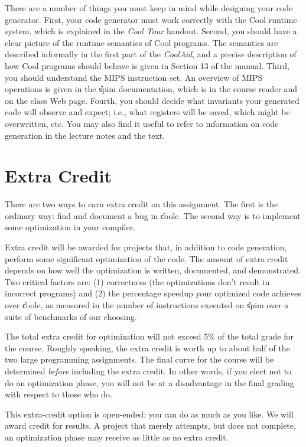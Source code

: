 There are a number of things you must keep in mind while designing
your code generator. First, your code generator must work correctly
with the Cool runtime system, which is explained in the {\em Cool Tour}
handout.  Second, you should have a clear picture of
the runtime semantics of Cool programs.  The semantics are described
informally in the first part of the {\em CoolAid}, and a precise
description of how Cool programs should behave is given in Section 13
of the manual.  Third, you
should understand the MIPS instruction set.  An overview of MIPS
operations is given in the \U{spim} documentation, which is in the
course reader and on the class Web page.
Fourth, you should decide what invariants your generated
code will observe and expect; i.e., what registers will be saved,
which might be overwritten, etc.  You may also find it useful to refer
to information on code generation in the lecture notes and the text.

\section{Extra Credit}

There are two ways to earn extra credit on this assignment.  The first is
the ordinary way: find and document a bug in \U{coolc}.  The second way
is to implement some optimization in your compiler.

Extra credit will be awarded for projects that, in addition to code
generation, perform some significant optimization of the code.  The
amount of extra credit depends on how well the optimization is
written, documented, and demonstrated.  Two critical factors are: (1)
correctness (the optimizations don't result in incorrect programs) and
(2) the percentage speedup your optimized code achieves over
\U{coolc}, as measured in the number of instructions executed on
\U{spim} over a suite of benchmarks of our choosing.

The total extra credit for optimization will not exceed 5\% of the 
total grade for the course.  Roughly speaking, the extra credit is
worth up to about half of the two large programming assignments.
The final curve for the course will be determined {\em before} including
the extra credit.  In other words, if you elect not to do an optimization
phase, you will not be at a disadvantage in the final grading with respect
to those who do.

This extra-credit option is open-ended; you can do as much as you
like.  We will award credit for results. A project that merely attempts, 
but does not complete, an optimization phase may receive as little
as no extra credit.

